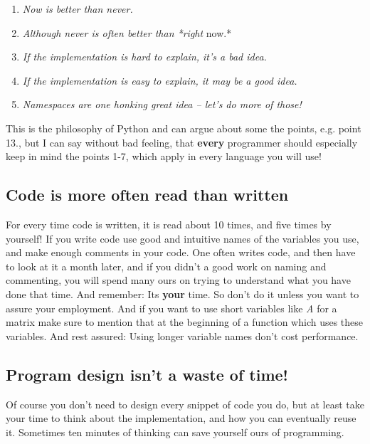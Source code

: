\documentclass[letterpaper,10pt,english]{manual}
\begin{document}
\begin{enumerate}
\item {} 
\emph{Now is better than never.}

\item {} 
\emph{Although never is often better than *right} now.*

\item {} 
\emph{If the implementation is hard to explain, it's a bad idea.}

\item {} 
\emph{If the implementation is easy to explain, it may be a good idea.}

\item {} 
\emph{Namespaces are one honking great idea -- let's do more of those!}

\end{enumerate}

This is the philosophy of Python and can argue about some the points,
e.g. point 13., but I can say without bad feeling, that \textbf{every}
programmer should especially keep in mind the points 1-7, which apply in every
language you will use!


\subsection{Code is more often read than written}

For every time code is written, it is read about 10 times, and
five times by yourself! If you write code use good and intuitive
names of the variables you use, and make enough comments in your code.
One often writes code, and then have to look at it a month later, and if
you didn't a good work on naming and commenting, you will spend many ours
on trying to understand what you have done that time. And remember: Its \textbf{your} time.
So don't do it unless you want to assure your employment.
And if you want to use short variables like \emph{A} for a matrix make sure to mention
that at the beginning of a function which uses these variables.
And rest assured: Using longer variable names don't cost performance.


\subsection{Program design isn't a waste of time!}

Of course you don't need to design every snippet of code you do,
but at least take your time to think about the implementation, and
how you can eventually reuse it. Sometimes ten minutes of thinking
can save yourself ours of programming.
\hypertarget{oo-ref}{}
\end{document}
